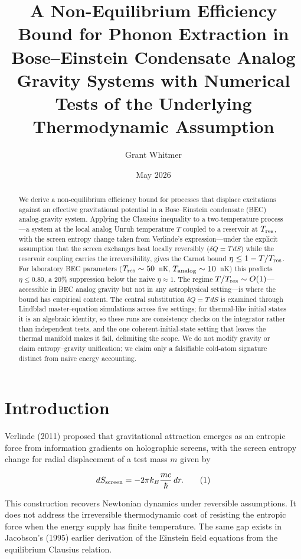\documentclass[11pt]{article}
\title{A Non-Equilibrium Efficiency Bound for Phonon Extraction in Bose–Einstein Condensate Analog Gravity Systems with Numerical Tests of the Underlying Thermodynamic Assumption}
\author{Grant Whitmer}
\date{May 2026}
\begin{document}
\maketitle
\begin{abstract}
We derive a non-equilibrium efficiency bound for processes that displace excitations against an effective gravitational potential in a Bose--Einstein condensate (BEC) analog-gravity system. Applying the Clausius inequality to a two-temperature process---a system at the local analog Unruh temperature $T$ coupled to a reservoir at $T_{\rm res}$, with the screen entropy change taken from Verlinde's expression---under the explicit assumption that the screen exchanges heat locally reversibly ($\delta Q = T\,dS$) while the reservoir coupling carries the irreversibility, gives the Carnot bound $\eta \le 1 - T/T_{\rm res}$. For laboratory BEC parameters ($T_{\rm res}\sim 50$~nK, $T_{\rm analog}\sim 10$~nK) this predicts $\eta \le 0.80$, a $20\%$ suppression below the naive $\eta\approx 1$. The regime $T/T_{\rm res}\sim O(1)$---accessible in BEC analog gravity but not in any astrophysical setting---is where the bound has empirical content. The central substitution $\delta Q = T\,dS$ is examined through Lindblad master-equation simulations across five settings; for thermal-like initial states it is an algebraic identity, so these runs are consistency checks on the integrator rather than independent tests, and the one coherent-initial-state setting that leaves the thermal manifold makes it fail, delimiting the scope. We do not modify gravity or claim entropy--gravity unification; we claim only a falsifiable cold-atom signature distinct from naive energy accounting.
\end{abstract}
\section{Introduction}\label{introduction}

Verlinde (2011) proposed that gravitational attraction emerges as an entropic force from information gradients on holographic screens, with the screen entropy change for radial displacement of a test mass \(m\) given by

\[dS_{\rm screen} = -2\pi k_B \frac{m c}{\hbar}\,dr. \tag{1}\]

This construction recovers Newtonian dynamics under reversible assumptions. It does not address the irreversible thermodynamic cost of resisting the entropic force when the energy supply has finite temperature. The same gap exists in Jacobson's (1995) earlier derivation of the Einstein field equations from the equilibrium Clausius relation.
\end{document}
